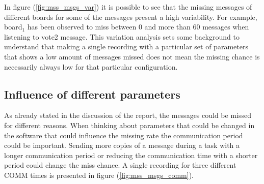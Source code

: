 \documentclass[table,xcdraw]{article}
\begin{document}
In figure (\ref{fig:mss_msgs_var}) it is possible to see that the missing messages of different boards for some of the messages present a high variability. For example, board$_1$ has been observed to miss between 0 and more than 60 messages when listening to vote2 message. This variation analysis sets some background to understand that making a single recording with a particular set of parameters that shows a low amount of messages missed does not mean the missing chance is necessarily always low for that particular configuration.

\subsection{Influence of different parameters}
As already stated in the discussion of the report, the messages could be missed for different reasons. When thinking about parameters that could be changed in the software that could influence the missing rate the communication period could be important. Sending more copies of a message during a task with a longer communication period or reducing the communication time with a shorter period could change the miss chance. A single recording for three different COMM times is presented in figure (\ref{fig:mss_msgs_comm}).\\
\end{document}
